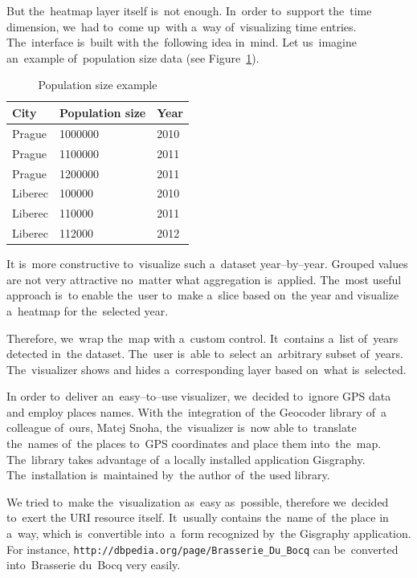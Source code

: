 But the~heatmap layer itself is~not enough. In~order to~support the~time 
dimension, we~had to~come up~with a~way of~visualizing time entries. The~interface is~built with the~following idea in~mind. Let us~imagine an~example of~population size data (see Figure~\ref{fig:impl-pop-ex}).

\begin{table}
  \begin{center}
\begin{tabular}{l|l|l}
  City & Population size & Year \\ \hline
  Prague   &    1000000   &   2010 \\
  Prague   &    1100000   &   2011 \\
  Prague   &    1200000   &   2011 \\
  Liberec   &    100000    &  2010 \\
  Liberec   &    110000    &  2011 \\
  Liberec    &   112000    &  2012
\end{tabular}
\caption{Population size example}
\label{fig:impl-pop-ex}
  \end{center}
\end{table}

It is~more constructive to~visualize such a~dataset year--by--year. Grouped values are 
not very attractive no~matter what aggregation is~applied. The~most useful 
approach is~to enable the~user to~make a~slice based on~the year and visualize a~heatmap for the~selected year.

Therefore, we~wrap the~map with a~custom control. It~contains a~list of~years 
detected in~the dataset. The~user is~able to~select an~arbitrary subset of~years. The~visualizer shows and hides a~corresponding layer based on~what is~selected. 

In order to~deliver an~easy--to--use visualizer, we~decided to~ignore GPS 
data and employ places names. With the~integration of~the Geocoder library of~a 
colleague of~ours, Matej Snoha, the~visualizer is~now able to~translate the~names of~the places to~GPS coordinates and place them into~the~map. The~library takes 
advantage of~a locally installed application Gisgraphy. The~installation is~maintained by~the author of~the used library.

We tried to~make the~visualization as~easy as~possible, therefore we~decided to~exert the
URI resource itself. It~usually contains the~name of~the place 
in a~way, which is~convertible into~a~form recognized by~the Gisgraphy 
application. For instance, \texttt{http://dbpedia.org/page/Brasserie\_Du\_Bocq} 
can be~converted into~Brasserie du~Bocq very easily.

